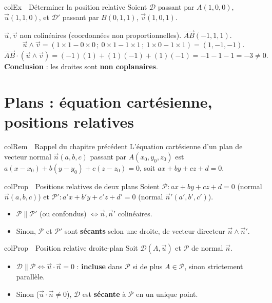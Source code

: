 \documentclass[11pt,a4paper]{article}
\newenvironment{propriete}[1][Propriété]
  {\begin{fiche}{colProp}{\ding{72}~~#1}}{\end{fiche}}
\newenvironment{exemple}[1][Exemple]
  {\begin{fiche}{colEx}{\ding{217}~~#1}}{\end{fiche}}
\newenvironment{remarque}[1][Remarque]
  {\begin{fiche}{colRem}{\ding{43}~~#1}}{\end{fiche}}
\begin{document}
\begin{exemple}[Déterminer la position relative]
Soient $\mathcal{D}$ passant par $A(1,0,0)$, $\vec u(1,1,0)$, et $\mathcal{D}'$ passant par $B(0,1,1)$, $\vec v(1,0,1)$.

\smallskip
$\vec u,\vec v$ non colinéaires (coordonnées non proportionnelles). $\overrightarrow{AB}(-1,1,1)$.
\[
  \vec u\wedge\vec v = (1\times1-0\times0\,;\ 0\times1-1\times1\,;\ 1\times0-1\times1) = (1,-1,-1).
\]
\[
  \overrightarrow{AB}\cdot(\vec u\wedge\vec v) = (-1)(1)+(1)(-1)+(1)(-1) = -1-1-1 = -3 \ne 0.
\]
\textbf{Conclusion} : les droites sont \textbf{non coplanaires}.
\end{exemple}

\section{Plans : équation cartésienne, positions relatives}

\begin{remarque}[Rappel du chapitre précédent]
L'équation cartésienne d'un plan de vecteur normal $\vec n(a,b,c)$ passant par $A(x_0,y_0,z_0)$ est $a(x-x_0)+b(y-y_0)+c(z-z_0)=0$, soit $ax+by+cz+d=0$.
\end{remarque}

\begin{propriete}[Positions relatives de deux plans]
Soient $\mathcal{P}:ax+by+cz+d=0$ (normal $\vec n(a,b,c)$) et $\mathcal{P}':a'x+b'y+c'z+d'=0$ (normal $\vec n'(a',b',c')$).
\begin{itemize}[leftmargin=6mm, itemsep=0.5mm]
  \item $\mathcal{P}\parallel\mathcal{P}'$ (ou confondus) $\iff \vec n,\vec n'$ colinéaires.
  \item Sinon, $\mathcal{P}$ et $\mathcal{P}'$ sont \textbf{sécants} selon une droite, de vecteur directeur $\vec n\wedge\vec n'$.
\end{itemize}
\end{propriete}

\begin{propriete}[Position relative droite-plan]
Soit $\mathcal{D}(A,\vec u)$ et $\mathcal{P}$ de normal $\vec n$.
\begin{itemize}[leftmargin=6mm, itemsep=0.5mm]
  \item $\mathcal{D}\parallel\mathcal{P} \iff \vec u\cdot\vec n=0$ : \textbf{incluse} dans $\mathcal{P}$ si de plus $A\in\mathcal{P}$, sinon strictement parallèle.
  \item Sinon ($\vec u\cdot\vec n\ne0$), $\mathcal{D}$ est \textbf{sécante} à $\mathcal{P}$ en un unique point.
\end{itemize}
\end{propriete}
\end{document}
